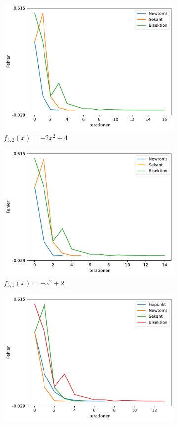 \documentclass[10pt]{scrartcl}
\newcommand{\1}{1\hspace{-0,9ex}1}
\begin{document}
\begin{figure}[!h]
\begin{subfigure}[b]{0.4\textwidth}
			\includegraphics[width=\textwidth]{plots/plot2.pdf}
			\caption*{$f_{3,2}(x) = -2x^2 + 4$}
		\end{subfigure}
		\begin{subfigure}[b]{0.4\textwidth}
			\includegraphics[width=\textwidth]{plots/plot3.pdf}
			\caption*{$f_{3,1}(x) = -x^2 + 2$}
		\end{subfigure}
		\begin{subfigure}[b]{0.4\textwidth}
			\includegraphics[width=\textwidth]{plots/plot4.pdf}

\end{subfigure}
\end{figure}
\end{document}
